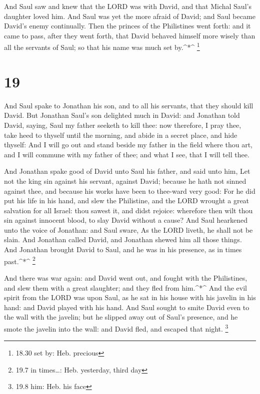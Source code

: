  And Saul saw and knew that the LORD was with David, and
that Michal Saul's daughter loved him.  And Saul was yet
the more afraid of David; and Saul became David's enemy continually.
 Then the princes of the Philistines went forth: and it
came to pass, after they went forth, that David behaved himself more
wisely than all the servants of Saul; so that his name was much set
by.\^{}*\^{} \footnote{18.30 set by: Heb. precious}

\hypertarget{section-18}{%
\section{19}\label{section-18}}

 And Saul spake to Jonathan his son, and to all his
servants, that they should kill David.  But Jonathan Saul's
son delighted much in David: and Jonathan told David, saying, Saul my
father seeketh to kill thee: now therefore, I pray thee, take heed to
thyself until the morning, and abide in a secret place, and hide
thyself:  And I will go out and stand beside my father in
the field where thou art, and I will commune with my father of thee; and
what I see, that I will tell thee.

 And Jonathan spake good of David unto Saul his father, and
said unto him, Let not the king sin against his servant, against David;
because he hath not sinned against thee, and because his works have been
to thee-ward very good:  For he did put his life in his
hand, and slew the Philistine, and the LORD wrought a great salvation
for all Israel: thou sawest it, and didst rejoice: wherefore then wilt
thou sin against innocent blood, to slay David without a cause?
 And Saul hearkened unto the voice of Jonathan: and Saul
sware, As the LORD liveth, he shall not be slain.  And
Jonathan called David, and Jonathan shewed him all those things. And
Jonathan brought David to Saul, and he was in his presence, as in times
past.\^{}*\^{} \footnote{19.7 in times\ldots: Heb. yesterday, third day}

 And there was war again: and David went out, and fought
with the Philistines, and slew them with a great slaughter; and they
fled from him.\^{}*\^{}  And the evil spirit from the LORD
was upon Saul, as he sat in his house with his javelin in his hand: and
David played with his hand.  And Saul sought to smite David
even to the wall with the javelin; but he slipped away out of Saul's
presence, and he smote the javelin into the wall: and David fled, and
escaped that night. \footnote{19.8 him: Heb. his face}

